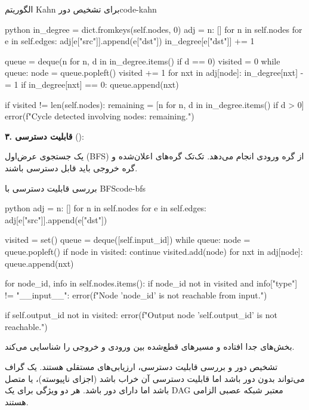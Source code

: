 \documentclass{nngraph-fa}
\begin{document}
\begin{codebox}{الگوریتم Kahn برای تشخیص دور}{code-kahn}
\begin{amzcode}{python}
in_degree = dict.fromkeys(self.nodes, 0)
adj       = {n: [] for n in self.nodes}
for e in self.edges:
    adj[e["src"]].append(e["dst"])
    in_degree[e["dst"]] += 1

queue   = deque(n for n, d in in_degree.items() if d == 0)
visited = 0
while queue:
    node = queue.popleft()
    visited += 1
    for nxt in adj[node]:
        in_degree[nxt] -= 1
        if in_degree[nxt] == 0:
            queue.append(nxt)

if visited != len(self.nodes):
    remaining = [n for n, d in in_degree.items() if d > 0]
    error(f"Cycle detected involving nodes: {remaining}.")
\end{amzcode}
\end{codebox}

\textbf{۳. قابلیت دسترسی} ():

یک جستجوی عرض‌اول (BFS) از گره ورودی انجام می‌دهد. تک‌تک گره‌های اعلان‌شده و گره خروجی باید قابل دسترسی باشند.

\begin{codebox}{بررسی قابلیت دسترسی با BFS}{code-bfs}
\begin{amzcode}{python}
adj = {n: [] for n in self.nodes}
for e in self.edges:
    adj[e["src"]].append(e["dst"])

visited = set()
queue   = deque([self.input_id])
while queue:
    node = queue.popleft()
    if node in visited:
        continue
    visited.add(node)
    for nxt in adj[node]:
        queue.append(nxt)

for node_id, info in self.nodes.items():
    if node_id not in visited and info["type"] != "__input__":
        error(f"Node '{node_id}' is not reachable from input.")

if self.output_id not in visited:
    error(f"Output node '{self.output_id}' is not reachable.")
\end{amzcode}
\end{codebox}

بخش‌های جدا افتاده و مسیرهای قطع‌شده بین ورودی و خروجی را شناسایی می‌کند.

\begin{notebox}
تشخیص دور و بررسی قابلیت دسترسی، ارزیابی‌های مستقلی هستند. یک گراف می‌تواند بدون دور باشد اما قابلیت دسترسی آن خراب باشد (اجزای ناپیوسته)، یا متصل باشد اما دارای دور باشد. هر دو ویژگی برای یک DAG معتبر شبکه عصبی الزامی هستند.
\end{notebox}
\end{document}
